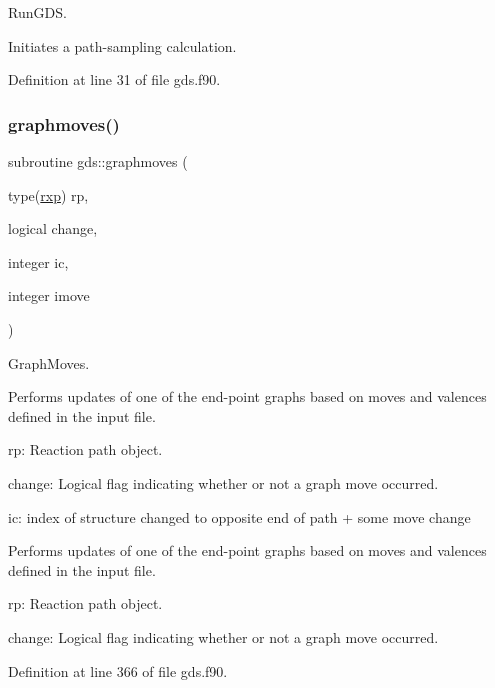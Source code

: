 Run\+G\+DS. 

Initiates a path-\/sampling calculation. 

Definition at line 31 of file gds.\+f90.

\mbox{\label{namespacegds_a3627a05f4a2a627ffe858a325b19039a}} 
\subsubsection{\texorpdfstring{graphmoves()}{graphmoves()}\hspace{0.1cm}{\footnotesize\ttfamily [1/2]}}
{\footnotesize\ttfamily subroutine gds\+::graphmoves (\begin{DoxyParamCaption}\item[{type(\mbox{\hyperlink{structrpath_1_1rxp}{rxp}})}]{rp,  }\item[{logical}]{change,  }\item[{integer}]{ic,  }\item[{integer}]{imove }\end{DoxyParamCaption})}



Graph\+Moves. 

Performs updates of one of the end-\/point graphs based on moves and valences defined in the input file.


\begin{DoxyItemize}
\item rp\+: Reaction path object.
\item change\+: Logical flag indicating whether or not a graph move occurred.
\item ic\+: index of structure changed to opposite end of path + some move change
\end{DoxyItemize}

Performs updates of one of the end-\/point graphs based on moves and valences defined in the input file.


\begin{DoxyItemize}
\item rp\+: Reaction path object.
\item change\+: Logical flag indicating whether or not a graph move occurred. 
\end{DoxyItemize}

Definition at line 366 of file gds.\+f90.

\mbox{\label{namespacegds_aadeb6df7bf80a77b35e92ead33b8fb0e}} 
